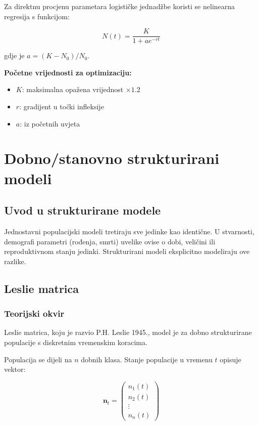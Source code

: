 \documentclass[11pt,oneside]{book}
\begin{document}
Za direktnu procjenu parametara logističke jednadžbe koristi se nelinearna regresija s funkcijom:

\begin{equation}
	N(t) = \frac{K}{1 + ae^{-rt}}
\end{equation}

gdje je $a = (K-N_0)/N_0$.

\textbf{Početne vrijednosti za optimizaciju:}
\begin{itemize}
	\item $K$: maksimalna opažena vrijednost $\times 1.2$
	\item $r$: gradijent u točki infleksije
	\item $a$: iz početnih uvjeta
\end{itemize}

\section{Dobno/stanovno strukturirani modeli}

\subsection{Uvod u strukturirane modele}

Jednostavni populacijski modeli tretiraju sve jedinke kao identične. U stvarnosti, demografi parametri (rođenja, smrti) uvelike ovise o dobi, veličini ili reproduktivnom stanju jedinki. Strukturirani modeli eksplicitno modeliraju ove razlike.

\subsection{Leslie matrica}

\subsubsection{Teorijski okvir}

Leslie matrica, koju je razvio P.H. Leslie 1945., model je za dobno strukturirane populacije s diskretnim vremenskim koracima.

Populacija se dijeli na $n$ dobnih klasa. Stanje populacije u vremenu $t$ opisuje vektor:

\begin{equation}
	\mathbf{n}_t = \begin{pmatrix} n_1(t) \\ n_2(t) \\ \vdots \\ n_n(t) \end{pmatrix}
\end{equation}
\end{document}
